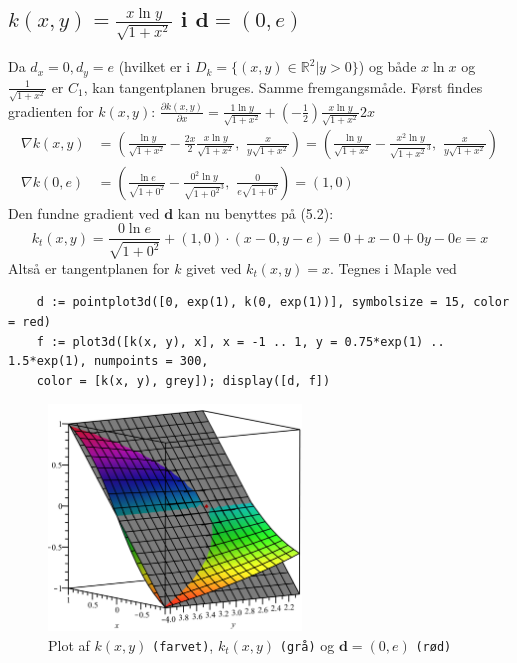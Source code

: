 \documentclass{report}
\begin{document}
\subsection{$k(x,y)=\frac{x\ln{y}}{\sqrt{1+x^2}}$ i $\mathbf{d}=(0,e)$}
Da $d_x=0,d_y=e$ (hvilket er i $D_k=\{(x,y)\in\mathbb{R}^2|y>0\}$) og både $x\ln{x}$ og $\frac{1}{\sqrt{1+x^2}}$ er $C_1$, kan tangentplanen bruges. Samme fremgangsmåde. Først findes gradienten for $k(x,y)$:
$\frac{\partial k(x,y)}{\partial x}=\frac{1\ln{y}}{\sqrt{1+x^2}}+(-\frac{1}{2})\frac{x\ln{y}}{\sqrt{1+x^2}}2x$
\begin{align*}
    \nabla k(x,y)&=\left(\frac{\ln{y}}{\sqrt{1+x^2}}-\frac{2x}{2}\frac{x\ln{y}}{\sqrt{1+x^2}},\,\,\frac{x}{y\sqrt{1+x^2}}\right)=\left(\frac{\ln{y}}{\sqrt{1+x^2}}-\frac{x^2\ln{y}}{\sqrt{1+x^2}^3},\,\,\frac{x}{y\sqrt{1+x^2}}\right)\\
    \nabla k(0,e)&=\left(\frac{\ln{e}}{\sqrt{1+0^2}}-\frac{0^2\ln{y}}{\sqrt{1+0^2}^3},\,\,\frac{0}{e\sqrt{1+0^2}}\right)=(1,0)
\end{align*}
Den fundne gradient ved $\mathbf{d}$ kan nu benyttes på (5.2):
\begin{equation}
    k_t(x,y)=\frac{0\ln{e}}{\sqrt{1+0^2}}+(1,0)\cdot(x-0,y-e)=0+x-0+0y-0e=x
\end{equation}
Altså er tangentplanen for $k$ givet ved $k_t(x,y)=x$. Tegnes i Maple ved\begin{verbatim}
    d := pointplot3d([0, exp(1), k(0, exp(1))], symbolsize = 15, color = red)
    f := plot3d([k(x, y), x], x = -1 .. 1, y = 0.75*exp(1) .. 1.5*exp(1), numpoints = 300, 
    color = [k(x, y), grey]); display([d, f])
\end{verbatim}
\begin{figure}[H]
    \centering
    \includegraphics[width=0.6\textwidth]{52d.png}
    \caption{Plot af $k(x,y)$ \texttt{(farvet)}, $k_t(x,y)$ \texttt{(grå)} og $\mathbf{d}=(0,e)$ \texttt{(rød)}}
\end{figure}
\end{document}
